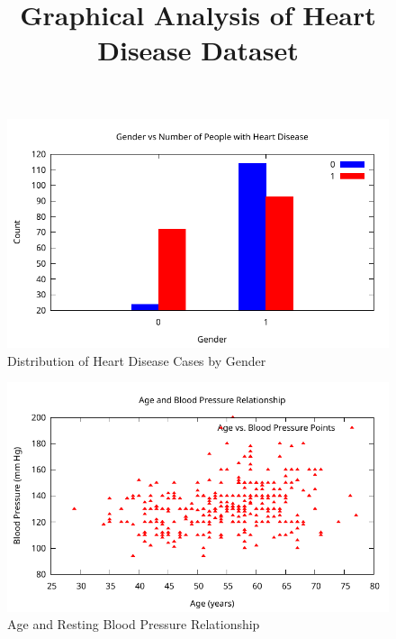 \documentclass{article}
\title{Graphical Analysis of Heart Disease Dataset}
\begin{document}
	\maketitle
	
	\begin{figure}[H]
		\centering
		\includegraphics[scale=0.7]{gender_vs_disease.pdf}
		\caption{Distribution of Heart Disease Cases by Gender}
		\label{fig:gender_disease_distribution}
	\end{figure}
	
	\begin{figure}[H]
		\centering
		\includegraphics[scale=0.7]{age_bp_relation.pdf}
		\caption{Age and Resting Blood Pressure Relationship}
		\label{fig:age_vs_bp}
	\end{figure}
	
\end{document}
